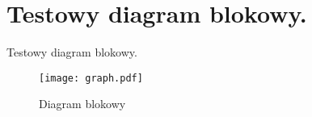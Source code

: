\documentclass[a4paper,11pt]{article}
\begin{document}
    \section*{Testowy diagram blokowy.}

    Testowy diagram blokowy.

    \begin{figure}[!htb]
        \centerline{\texttt{[image: graph.pdf]}}
        \caption{Diagram blokowy}
    \end{figure}
\end{document}
